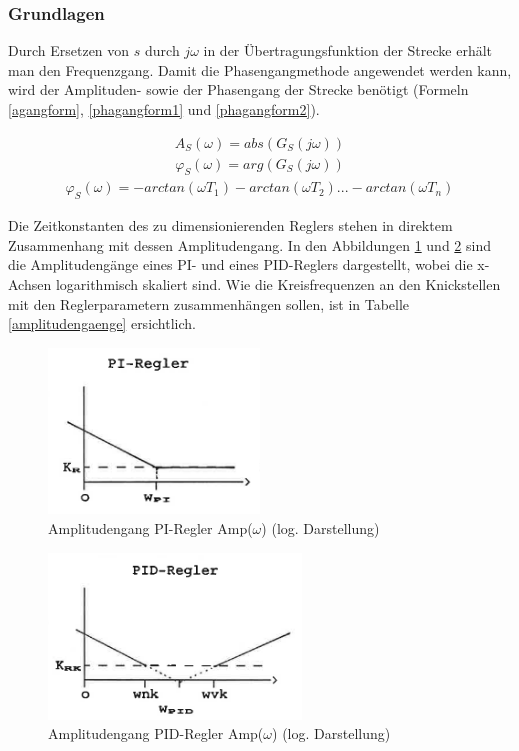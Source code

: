 \subsubsection{Grundlagen}
Durch Ersetzen von $s$ durch $j\omega$ in der Übertragungsfunktion der Strecke erhält man den Frequenzgang. Damit die Phasengangmethode angewendet werden kann, wird der Amplituden- sowie der Phasengang der Strecke benötigt (Formeln \ref{agangform}, \ref{phagangform1} und \ref{phagangform2}).


\begin{align}
A_S(\omega)=abs(G_S(j\omega))
\label{agangform}
\end{align}
\begin{align}
\varphi_S(\omega)=arg(G_S(j\omega))
\label{phagangform1}
\end{align}
\begin{align}
\varphi_S(\omega)=-arctan(\omega T_1)-arctan(\omega T_2)...-arctan(\omega T_n)
\label{phagangform2}
\end{align}\newline

Die Zeitkonstanten des zu dimensionierenden Reglers stehen in direktem Zusammenhang mit dessen Amplitudengang. In den Abbildungen \ref{agangpi} und \ref{agangpid} sind die Amplitudengänge eines PI- und eines PID-Reglers dargestellt, wobei die x-Achsen logarithmisch skaliert sind. Wie die Kreisfrequenzen an den Knickstellen mit den Reglerparametern zusammenhängen sollen, ist in Tabelle \ref{amplitudengaenge} ersichtlich.\newline

\begin{figure}[h]
\centering
\includegraphics[width=0.5\textwidth]{agangpi.png}
\caption{Amplitudengang PI-Regler Amp($\omega$) (log. Darstellung) \cite{zellwegerpha}}
\label{agangpi}
\end{figure}

\begin{figure}[h]
\centering
\includegraphics[width=0.6\textwidth]{agangpid.png}
\caption{Amplitudengang PID-Regler Amp($\omega$) (log. Darstellung) \cite{zellwegerpha}}
\label{agangpid}
\end{figure}

